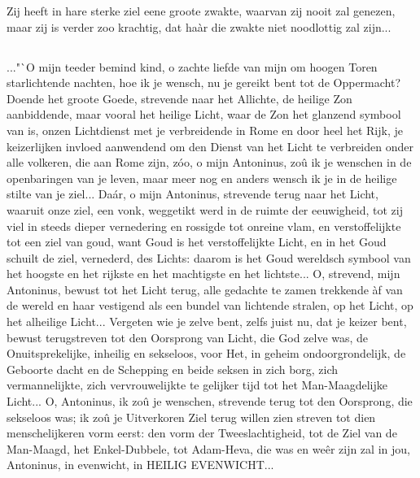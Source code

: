 \documentclass[a4paper, 12pt, oneside, dutch]{article}
\begin{document}
Zij heeft in hare sterke ziel eene groote zwakte, waarvan zij nooit zal genezen, maar zij is verder zoo krachtig, dat haàr die zwakte niet noodlottig zal zijn...

\subsection{}
\paragraph{}
..."`O mijn teeder bemind kind, o zachte liefde van mijn om hoogen Toren starlichtende nachten, hoe ik je wensch, nu je gereikt bent tot de Oppermacht? Doende het groote Goede, strevende naar het Allichte, de heilige Zon aanbiddende, maar vooral het heilige Licht, waar de Zon het glanzend symbool van is, onzen Lichtdienst met je verbreidende in Rome en door heel het Rijk, je keizerlijken invloed aanwendend om den Dienst van het Licht te verbreiden onder alle volkeren, die aan Rome zijn, zóo, o mijn Antoninus, zoû ik je wenschen in de openbaringen van je leven, maar meer nog en anders wensch ik je in de heilige stilte van je ziel... Daár, o mijn Antoninus, strevende terug naar het Licht, waaruit onze ziel, een vonk, weggetikt werd in de ruimte der eeuwigheid, tot zij viel in steeds dieper vernedering en rossigde tot onreine vlam, en verstoffelijkte tot een ziel van goud, want Goud is het verstoffelijkte Licht, en in het Goud schuilt de ziel, vernederd, des Lichts: daarom is het Goud wereldsch symbool van het hoogste en het rijkste en het machtigste en het lichtste... O, strevend, mijn Antoninus, bewust tot het Licht terug, alle gedachte te zamen trekkende àf van de wereld en haar vestigend als een bundel van lichtende stralen, op het Licht, op het alheilige Licht... Vergeten wie je zelve bent, zelfs juist nu, dat je keizer bent, bewust terugstreven tot den Oorsprong van Licht, die God zelve was, de Onuitsprekelijke, inheilig en sekseloos, voor Het, in geheim ondoorgrondelijk, de Geboorte dacht en de Schepping en beide seksen in zich borg, zich vermannelijkte, zich vervrouwelijkte te gelijker tijd tot het Man-Maagdelijke Licht... O, Antoninus, ik zoû je wenschen, strevende terug tot den Oorsprong, die sekseloos was; ik zoû je Uitverkoren Ziel terug willen zien streven tot dien menschelijkeren vorm eerst: den vorm der Tweeslachtigheid, tot de Ziel van de Man-Maagd, het Enkel-Dubbele, tot Adam-Heva, die was en weêr zijn zal in jou, Antoninus, in evenwicht, in HEILIG EVENWICHT...
\end{document}

